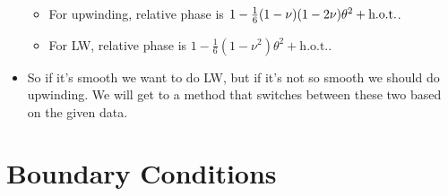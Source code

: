 \documentclass{article}
\newcommand{\hot}{\text{h.o.t.}}
\begin{document}
\begin{itemize}
            \begin{itemize}
                \item For upwinding, relative phase is $1 - \frac{1}{6}\qty(1 - \nu)(1 - 2\nu)\theta^2 + \hot$.
                \item For LW, relative phase is $1 - \frac{1}{6}(1 - \nu^2)\theta^2 + \hot$.
            \end{itemize}
            \item So if it's smooth we want to do LW, but if it's not so smooth we should do upwinding.  We will get to a method that switches between these two based on the given data.
        \end{itemize}

    \section{Boundary Conditions}
\end{document}
